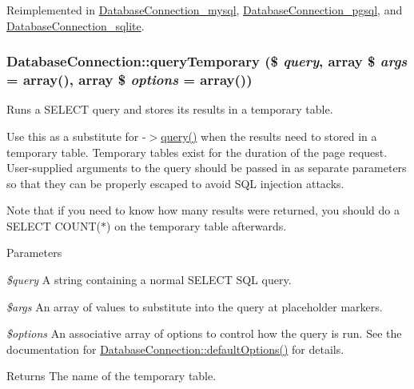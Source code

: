 Reimplemented in \hyperlink{classDatabaseConnection__mysql_a8fa3e83f5a5e85e85d2b06247a8d8a24}{DatabaseConnection\_\-mysql}, \hyperlink{classDatabaseConnection__pgsql_aabdd2246a4122962112ff37ab080eee7}{DatabaseConnection\_\-pgsql}, and \hyperlink{classDatabaseConnection__sqlite_a5c7aa6402ebb35a61c7753fa66ee6bd3}{DatabaseConnection\_\-sqlite}.\hypertarget{classDatabaseConnection_ae4d9ad286187f493172da04fca77ca8f}{
\subsubsection[{queryTemporary}]{\setlength{\rightskip}{0pt plus 5cm}DatabaseConnection::queryTemporary (\$ {\em query}, \/  array \$ {\em args} = {\ttfamily array()}, \/  array \$ {\em options} = {\ttfamily array()})}}
\label{classDatabaseConnection_ae4d9ad286187f493172da04fca77ca8f}
Runs a SELECT query and stores its results in a temporary table.

Use this as a substitute for -\/$>$\hyperlink{classDatabaseConnection_aff564097281c4496e9d10cb1bccbe98d}{query()} when the results need to stored in a temporary table. Temporary tables exist for the duration of the page request. User-\/supplied arguments to the query should be passed in as separate parameters so that they can be properly escaped to avoid SQL injection attacks.

Note that if you need to know how many results were returned, you should do a SELECT COUNT($\ast$) on the temporary table afterwards.


\begin{DoxyParams}{Parameters}
\item[{\em \$query}]A string containing a normal SELECT SQL query. \item[{\em \$args}]An array of values to substitute into the query at placeholder markers. \item[{\em \$options}]An associative array of options to control how the query is run. See the documentation for \hyperlink{classDatabaseConnection_a190539d6c494ef2d7ac90d21226de5a5}{DatabaseConnection::defaultOptions()} for details.\end{DoxyParams}
\begin{DoxyReturn}{Returns}
The name of the temporary table. 
\end{DoxyReturn}



